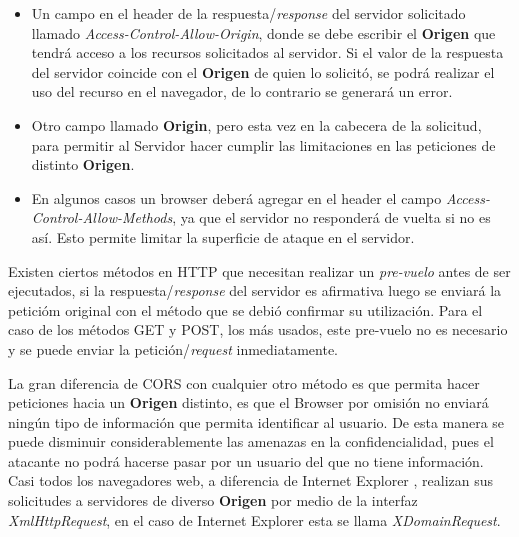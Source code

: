         \begin{itemize}
            \item Un campo en el header de la respuesta/\textit{response} del servidor solicitado llamado \textit{Access-Control-Allow-Origin}, donde se debe escribir el \textbf{Origen} que tendrá acceso a los recursos solicitados al servidor. Si el valor de la respuesta del servidor coincide con el \textbf{Origen} de quien lo solicitó, se podrá realizar el uso del recurso en el navegador, de lo contrario se generará un error.

            \item Otro campo llamado \textbf{Origin}, pero esta vez en la cabecera de la solicitud, para permitir al Servidor hacer cumplir las limitaciones en las peticiones de distinto \textbf{Origen}.

            \item En algunos casos un browser deberá agregar en el header el campo \textit{Access-Control-Allow-Methods}, ya que el servidor no responderá de vuelta si no es así. Esto permite limitar la superficie de ataque en el servidor.

        \end{itemize}
    Existen ciertos métodos en HTTP que necesitan realizar un \textit{pre-vuelo} antes de ser ejecutados, si la respuesta/\textit{response} del servidor es afirmativa luego se enviará la peticióm original con el método que se debió confirmar su utilización. Para el caso de los métodos GET y POST, los más usados, este pre-vuelo no es necesario y se puede enviar la petición/\textit{request} inmediatamente.
    
    La gran diferencia de CORS con cualquier otro método es que permita hacer peticiones hacia un \textbf{Origen} distinto, es que el Browser por omisión no enviará ningún tipo de información que permita identificar al usuario. De esta manera se puede disminuir considerablemente las amenazas en la confidencialidad, pues el atacante no podrá hacerse pasar por un usuario del que no tiene información. Casi todos los navegadores web, a diferencia de Internet Explorer \cite{bookWebAppSec}, realizan sus solicitudes a servidores de diverso \textbf{Origen} por medio de la interfaz \textit{XmlHttpRequest}, en el caso de Internet Explorer esta se llama \textit{XDomainRequest}.


